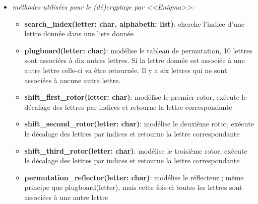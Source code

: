 \documentclass[a4paper,12pt,abstracton,titlepage]{scrartcl}
\begin{document}
\begin{itemize}
\begin{itemize}
\vspace{0.5cm}
\item \textit{méthodes utilisées pour le (dé)cryptage par <<Enigma>>:}
\vspace{0.3cm}
\begin{itemize}
\item \textbf{search\_index(letter: char, alphabeth: list)}:
cherche l'indice d'une lettre donnée dans une liste donnée\\
\item \textbf{plugboard(letter: char)}:
modélise le tableau de permutation, 10 lettres sont associées à dix autres lettres. Si la lettre donnée est associée à une autre lettre celle-ci va être retournée. Il y a six lettres qui ne sont associées à aucune autre lettre.\\
\item \textbf{shift\_first\_rotor(letter: char)}:
modélise le premier rotor, exécute le décalage des lettres par indices et retourne la lettre correspondante\\
\item \textbf{shift\_second\_rotor(letter: char)}:
modélise le deuxième rotor, exécute le décalage des lettres par indices et retourne la lettre correspondante\\
\item \textbf{shift\_third\_rotor(letter: char)}:
modélise le troisième rotor, exécute le décalage des lettres par indices et retourne la lettre correspondante\\
\item \textbf{permutation\_reflector(letter: char)}:
modélise le réflecteur ; même principe que plugboard(letter), mais cette fois-ci toutes les lettres sont associées à une autre lettre\\
 \end{itemize}
 \end{itemize}
\vspace{0.4cm}


\end{itemize}
\end{document}
